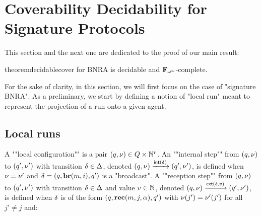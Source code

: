 \section{Coverability Decidability for Signature Protocols}
\label{sec:cover-decidability}

This section and the next one are dedicated to the proof of our main result:

\begin{restatable}{theorem}{decidablecover}
\label{thm:decidable-cover}
\COVER for BNRA is decidable and $\mathbf{F}_{\omega^\omega}$-complete.
\end{restatable}

For the sake of clarity, in this section, we will first focus on the case of "signature BNRA". 
As a preliminary, we start by defining a notion of "local run" meant to represent the projection of a run onto a given agent. 


\subsection{Local runs}
\AP A ""local configuration"" is a pair $(q, \nu) \in Q \times \mathbb{N}^r$.  
\AP An ""internal step"" from $(q,\nu)$ to $(q',\nu')$ with transition $\delta \in \Delta$, denoted $(q,\nu) \xrightarrow{\mathsf{int}(\delta)} (q',\nu')$, is defined when $\nu = \nu'$ and $\delta =(q, \textbf{br}(m, i), q')$ is a "broadcast".  
\AP A ""reception step"" from $(q,\nu)$ to $(q',\nu')$ with transition $\delta \in \Delta$ and value $v \in \mathbb{N}$, denoted $(q,\nu) \xrightarrow{\mathsf{ext}(\delta,v)} (q',\nu')$, is defined when $\delta$ is of the form $(q,\textbf{rec}(m, j, \alpha),q')$ with $\nu(j') = \nu'(j')$ for all $j' \neq j$ and:
	
